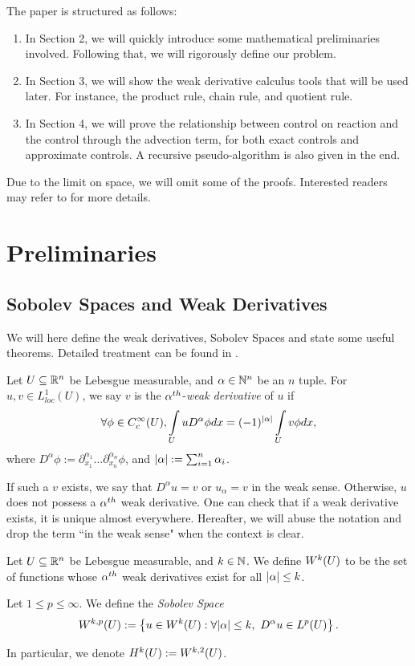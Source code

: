 \documentclass{ifacconf}
\begin{document}
The paper is structured as follows:
\begin{enumerate}[label=\arabic*.]
\item In Section 2, we will quickly introduce some mathematical preliminaries involved. Following that, we will rigorously define our problem. 
    \item In Section 3, we will show the weak derivative calculus tools that will be used later. For instance, the product rule, chain rule, and quotient rule.
    \item In Section 4, we will prove the relationship between control on reaction and the control through the advection term, for both exact controls and approximate controls. A recursive pseudo-algorithm is also given in the end.
\end{enumerate}
Due to the limit on space, we will omit some of the proofs. Interested readers may refer to \cite{yixing_multiplicative_2025} for more details. 

\section{Preliminaries}
\subsection{Sobolev Spaces and Weak Derivatives}
We will here define the weak derivatives, Sobolev Spaces and state some useful theorems. Detailed treatment can be found in \cite{ziemer_weakly_1989, royden_real_1993, evans_partial_2010}.
\begin{defn}
    Let $U \subseteq {\mathbb{R}}^n$ be Lebesgue measurable, and $\alpha \in {\mathbb{N}}^n$ be an $n$ tuple. For $u,v \in L_{loc}^1(U)$, we say $v$ is the $\alpha^{th}$-\textit{weak derivative} of $u$ if $$\forall \phi \in C_c^\infty(U), \int_U uD^\alpha\phi dx = (-1)^\abs{\alpha}\int_U v \phi dx,$$
    where $D^\alpha \phi := \partial_{x_1}^{\alpha_1} \dots \partial_{x_n}^{\alpha_n}\phi$, and ${\left\vert \alpha \right\vert} := \sum_{i=1}^n\alpha_i$.

    If such a $v$ exists, we say that $D^\alpha u = v$ or $u_\alpha = v$ in the weak sense. Otherwise, $u$ does not possess a $\alpha^{th}$ weak derivative. One can check that if a weak derivative exists, it is unique almost everywhere. Hereafter, we will abuse the notation and drop the term ``in the weak sense" when the context is clear.
\end{defn}

\begin{defn}
    Let $U \subseteq {\mathbb{R}}^n$ be Lebesgue measurable, and $k \in {\mathbb{N}}$. We define ${W^{k}_{}{\left ( U \right )}}$ to be the set of functions whose $\alpha^{th}$ weak derivatives exist for all ${\left\vert \alpha \right\vert} \leq k$.
    
    Let $1 \leq p \leq \infty$. We define the \textit{Sobolev Space} $${W^{k,p}_{}{\left ( U \right )}} := \left\{ u \in {W^{k}_{}{\left ( U \right )}}: \forall {\left\vert \alpha \right\vert} \leq k, ~ D^\alpha u\in L^p(U) \right\}.$$

    In particular, we denote ${H^{k}_{}{\left ( U \right )}} := {W^{k,2}_{}{\left ( U \right )}}$.
\end{defn}
\end{document}
